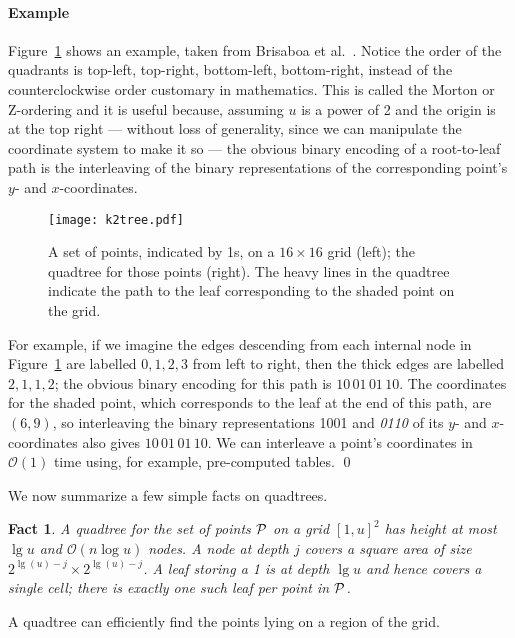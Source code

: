\documentclass{elsarticle}
\newtheorem{fact}[theorem]{Fact}
\newcommand{\Oh}[1]
  {\ensuremath{\mathcal{O}\!\left( {#1} \right)}}
\newcommand {\changed}[1]{#1}
\newenvironment{example}{\paragraph{Example}}{\qed \medskip }
\begin{document}
\begin{example}
Figure~\ref{fig:tree} shows an example, taken from Brisaboa et al.~\cite{BCBNP20}.  Notice the order of the quadrants is top-left, top-right, bottom-left, bottom-right, instead of the counterclockwise order customary in mathematics.  This is called the Morton or Z-ordering and it is useful because, assuming $u$ is a power of 2 and the origin is at the top right --- without loss of generality, since we can manipulate the coordinate system to make it so --- the obvious binary encoding of a root-to-leaf path is the interleaving of the binary representations of the corresponding point's $y$- and $x$-coordinates.

\begin{figure}
\begin{center}
\texttt{[image: k2tree.pdf]}
\caption{A set of points, indicated by 1s, on a \(16 \times 16\) grid (left); the quadtree for those points (right).  The heavy lines in the quadtree indicate the path to the leaf corresponding to the shaded point on the grid.}
\label{fig:tree}
\end{center}
\end{figure}

For example, if we imagine the edges descending from each internal node in Figure~\ref{fig:tree} are labelled \(0, 1, 2, 3\) from left to right, then the thick edges are labelled \(2, 1, 1, 2\); the obvious binary encoding for this path is \(10\,01\,01\,10\).  The coordinates for the shaded point, which corresponds to the leaf at the end of this path, are \((6, 9)\), so interleaving the binary representations 1001 and {\it 0110} of its $y$- and $x$-coordinates also gives \(1\mathit{0}\,0\mathit{1}\,0\mathit{1}\,1\mathit{0}\). \changed{We can interleave a point's coordinates in $\Oh{1}$ time using, for example, pre-computed tables}.
\end{example}

We now summarize a few simple facts on quadtrees.

\begin{fact}
\label{fact:basics}
A quadtree for the set of points $\cal P$ on a grid $[1,u]^2$ has height at most \(\lg u\) and $\Oh{n \log u}$ nodes. A node at depth $j$ covers a square area of size \(2^{\lg(u)-j} \times 2^{\lg(u)-j}\). A leaf storing a 1 is at depth $\lg u$ and hence covers
a single cell; there is exactly one such leaf per point in $\cal P$.
\end{fact}

A quadtree can efficiently find the points lying on a region of the grid.
\end{document}

